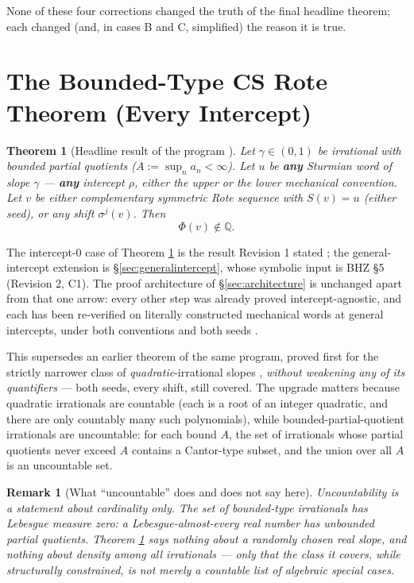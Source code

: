 \documentclass[11pt]{article}
\newtheorem{theorem}{Theorem}[section]
\newtheorem*{remark}{Remark}
\newcommand{\Q}{\mathbb{Q}}
\begin{document}
None of these four corrections changed the truth of the final headline theorem; each changed (and, in cases B and C, simplified) the reason it is true.

\section{The Bounded-Type CS Rote Theorem (Every Intercept)}
\label{sec:boundedtype}

\begin{theorem}[Headline result of the program \cite{Phase8Proof}]
\label{thm:boundedtype}
Let $\gamma\in(0,1)$ be irrational with bounded partial quotients ($A:=\sup_n a_n<\infty$). Let $u$
be \textbf{any} Sturmian word of slope $\gamma$ --- \textbf{any} intercept $\rho$, either the upper
or the lower mechanical convention. Let $v$ be either complementary symmetric Rote sequence with
$S(v)=u$ (either seed), or any shift $\sigma^j(v)$. Then
\[
\Phi(v)\notin\Q.
\]
\end{theorem}

The intercept-$0$ case of Theorem \ref{thm:boundedtype} is the result Revision 1 stated
\cite{Phase6Bounded}; the general-intercept extension is \S\ref{sec:generalintercept}, whose
symbolic input is BHZ \cite{BHZ2006} \S5 (Revision 2, C1). The proof architecture of
\S\ref{sec:architecture} is unchanged apart from that one arrow: every other step was already
proved intercept-agnostic, and each has been re-verified on literally constructed mechanical words
at general intercepts, under both conventions and both seeds \cite{Phase8Chain}.

This supersedes an earlier theorem of the same program, proved first for the strictly narrower class of \emph{quadratic}-irrational slopes \cite{Phase4Quadratic}, \emph{without weakening any of its quantifiers} --- both seeds, every shift, still covered. The upgrade matters because quadratic irrationals are countable (each is a root of an integer quadratic, and there are only countably many such polynomials), while bounded-partial-quotient irrationals are uncountable: for each bound $A$, the set of irrationals whose partial quotients never exceed $A$ contains a Cantor-type subset, and the union over all $A$ is an uncountable set.

\begin{remark}[What ``uncountable'' does and does not say here]
Uncountability is a statement about cardinality only. The set of bounded-type irrationals has Lebesgue measure zero: a Lebesgue-almost-every real number has \emph{unbounded} partial quotients. Theorem \ref{thm:boundedtype} says nothing about a randomly chosen real slope, and nothing about density among all irrationals --- only that the class it covers, while structurally constrained, is not merely a countable list of algebraic special cases.
\end{remark}
\end{document}
